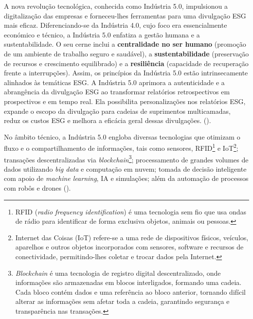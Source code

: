 A nova revolução tecnológica, conhecida como Indústria 5.0, impulsionou a digitalização das empresas e forneceu-lhes ferramentas para uma divulgação ESG mais eficaz. Diferenciando-se da Indústria 4.0, cujo foco era essencialmente económico e técnico, a Indústria 5.0 enfatiza a gestão humana e a sustentabilidade. O seu cerne inclui a \textbf{centralidade no ser humano} (promoção de um ambiente de trabalho seguro e saudável), a \textbf{sustentabilidade} (preservação de recursos e crescimento equilibrado) e a \textbf{resiliência} (capacidade de recuperação frente a interrupções). Assim, os princípios da Indústria 5.0 estão intrinsecamente alinhados às temáticas ESG. A Indústria 5.0 aprimora a autenticidade e a abrangência da divulgação ESG ao transformar relatórios retrospectivos em prospectivos e em tempo real. Ela possibilita personalizações nos relatórios ESG, expande o escopo da divulgação para cadeias de suprimentos multicamadas, reduz os custos ESG e melhora a eficácia geral dessas divulgações.  (\cite{Asif2023}).

No âmbito técnico, a Indústria 5.0 engloba diversas tecnologias que otimizam o fluxo e o compartilhamento de informações, tais como sensores, RFID\footnote{RFID (\textit{radio frequency identification}) é uma tecnologia sem fio que usa ondas de rádio para identificar de forma exclusiva objetos, animais ou pessoas.} e IoT\footnote{Internet das Coisas (IoT) refere-se a uma rede de dispositivos físicos, veículos, aparelhos e outros objetos incorporados com sensores, software e recursos de conectividade, permitindo-lhes coletar e trocar dados pela Internet.}; transações descentralizadas via \textit{blockchain}\footnote{\textit{Blockchain} é uma tecnologia de registro digital descentralizado, onde informações são armazenadas em blocos interligados, formando uma cadeia. Cada bloco contém dados e uma referência ao bloco anterior, tornando difícil alterar as informações sem afetar toda a cadeia, garantindo segurança e transparência nas transações.}; processamento de grandes volumes de dados utilizando \textit{big data} e computação em nuvem; tomada de decisão inteligente com apoio de \textit{machine learning}, IA e simulações; além da automação de processos com robôs e drones (\cite{Asif2023}).

